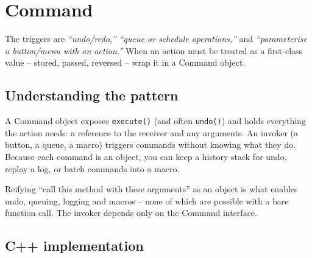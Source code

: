 \section{Command}
\label{sec:pat-command}


\begin{patternbox}
The triggers are \emph{``undo/redo,''} \emph{``queue or schedule
operations,''} and \emph{``parameterise a button/menu with an action.''}
When an action must be treated as a first-class value -- stored, passed,
reversed -- wrap it in a Command object.
\end{patternbox}

\subsection*{Understanding the pattern}

A Command object exposes \texttt{execute()} (and often \texttt{undo()})
and holds everything the action needs: a reference to the receiver and any
arguments. An invoker (a button, a queue, a macro) triggers commands
without knowing what they do. Because each command is an object, you can
keep a history stack for undo, replay a log, or batch commands into a
macro.

\begin{ideabox}
Reifying ``call this method with these arguments'' as an object is what
enables undo, queuing, logging and macros -- none of which are possible
with a bare function call. The invoker depends only on the Command
interface.
\end{ideabox}

\subsection*{C++ implementation}

